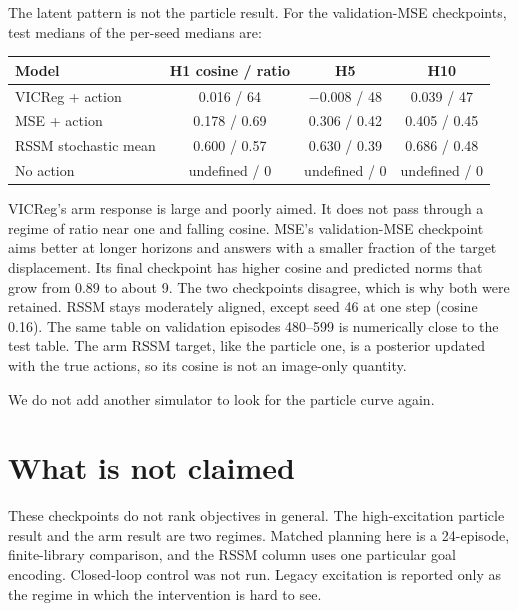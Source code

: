 \documentclass{article}
\begin{document}
The latent pattern is not the particle result. For the validation-MSE checkpoints, test medians of the per-seed medians are:

\begin{center}
\begin{tabular}{lccc}
\toprule
Model & H1 cosine / ratio & H5 & H10 \\
\midrule
VICReg + action & 0.016 / 64 & $-0.008$ / 48 & 0.039 / 47 \\
MSE + action & 0.178 / 0.69 & 0.306 / 0.42 & 0.405 / 0.45 \\
RSSM stochastic mean & 0.600 / 0.57 & 0.630 / 0.39 & 0.686 / 0.48 \\
No action & undefined / 0 & undefined / 0 & undefined / 0 \\
\bottomrule
\end{tabular}
\end{center}

VICReg's arm response is large and poorly aimed. It does not pass through a regime of ratio near one and falling cosine. MSE's validation-MSE checkpoint aims better at longer horizons and answers with a smaller fraction of the target displacement. Its final checkpoint has higher cosine and predicted norms that grow from 0.89 to about 9. The two checkpoints disagree, which is why both were retained. RSSM stays moderately aligned, except seed 46 at one step (cosine 0.16). The same table on validation episodes 480--599 is numerically close to the test table. The arm RSSM target, like the particle one, is a posterior updated with the true actions, so its cosine is not an image-only quantity.

We do not add another simulator to look for the particle curve again.

\section{What is not claimed}

These checkpoints do not rank objectives in general. The high-excitation particle result and the arm result are two regimes. Matched planning here is a 24-episode, finite-library comparison, and the RSSM column uses one particular goal encoding. Closed-loop control was not run. Legacy excitation is reported only as the regime in which the intervention is hard to see.
\end{document}
